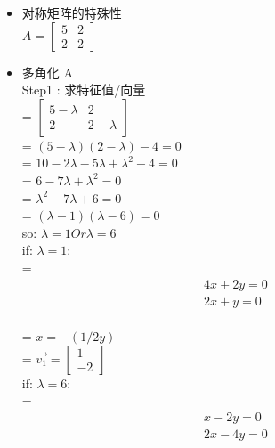 \documentclass[12pt]{article}
\begin{document}
\begin{flushleft}
    \begin{itemize}
        \item 对称矩阵的特殊性 \\
              $A = \begin{bmatrix}
                      5 & 2 \\
                      2 & 2
                  \end{bmatrix}$ \\
        \item 多角化 A  \\
              Step1 : 求特征值/向量\\
              = $\begin{bmatrix}
                      5 - \lambda & 2           \\
                      2           & 2 - \lambda
                  \end{bmatrix}$ \\
              = $(5 - \lambda)(2 - \lambda) -  4  = 0 $ \\
              = $ 10 - 2\lambda - 5\lambda  + \lambda^{2} - 4 = 0$ \\
              = $ 6 - 7\lambda  +  \lambda^{2} = 0$ \\
              = $ \lambda^{2} - 7\lambda  + 6  = 0$ \\
              = $(\lambda - 1) (\lambda - 6) = 0 $ \\
              so: $\lambda = 1  Or \lambda = 6$ \\
              if: $\lambda = 1$: \\
              = \begin{align}
                  4x  +  2y  = 0 \\
                  2x  +  y   = 0
              \end{align} \\
              = $x = -(1/2y)$ \\
              = $\vec{v_1} = \begin{bmatrix}
                      1 \\
                      -2
                  \end{bmatrix}$ \\
              if: $\lambda = 6$: \\
              = \begin{align}
                  x  -  2y  = 0 \\
                  2x  - 4y   = 0

\end{align}
\end{itemize}
\end{flushleft}
\end{document}
